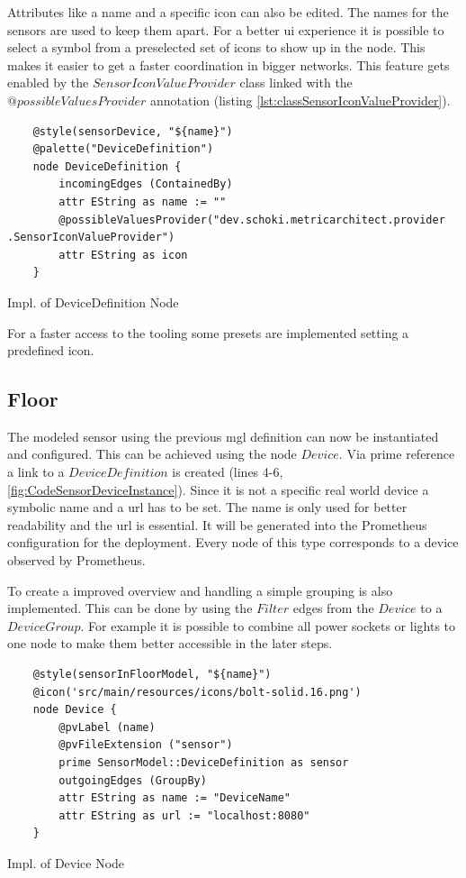 Attributes like a name and a specific icon  can also be edited. The names for the sensors are used to keep them apart. For a better \gls{ui} experience it is possible to select a symbol from a preselected set of icons to show up in the node. This makes it easier to get a faster coordination in bigger networks. This feature gets enabled by the $SensorIconValueProvider$ class linked with the $@possibleValuesProvider$ annotation (listing \ref{lst:classSensorIconValueProvider}).
\begin{listing}[H]
	\begin{verbatim}
	@style(sensorDevice, "${name}")
	@palette("DeviceDefinition")
	node DeviceDefinition {
		incomingEdges (ContainedBy)
		attr EString as name := ""
		@possibleValuesProvider("dev.schoki.metricarchitect.provider .SensorIconValueProvider")
		attr EString as icon
	}	
	\end{verbatim}
	\caption{Impl. of DeviceDefinition Node}
	\label{fig:CodeSensorDevice}
\end{listing}
For a faster access to the tooling some presets are implemented setting a predefined icon.
\subsection{Floor}
The modeled sensor using the previous \gls{mgl} definition can now be instantiated and configured. This can be achieved using the node $Device$. Via prime reference a link to a $DeviceDefinition$ is created (lines 4-6, \ref{fig:CodeSensorDeviceInstance}). Since it is not a specific real world device a symbolic name and a \gls{url} has to be set. The name is only used for better readability and the \gls{url} is essential. It will be generated into the Prometheus configuration for the deployment. Every node of this type corresponds to a device observed by Prometheus. 

To create a improved overview and handling a simple grouping is also implemented. This can be done by using the $Filter$ edges from the $Device$ to a $DeviceGroup$. For example it is possible to combine all power sockets or lights to one node to make them better accessible in the later steps. 

\begin{listing}[H]
	\begin{verbatim}
	@style(sensorInFloorModel, "${name}")
	@icon('src/main/resources/icons/bolt-solid.16.png')
	node Device {
		@pvLabel (name)
		@pvFileExtension ("sensor")
		prime SensorModel::DeviceDefinition as sensor
		outgoingEdges (GroupBy)
		attr EString as name := "DeviceName"
		attr EString as url := "localhost:8080"
	}	
	\end{verbatim}
	\caption{Impl. of Device Node}
	\label{fig:CodeSensorDeviceInstance}
\end{listing}

